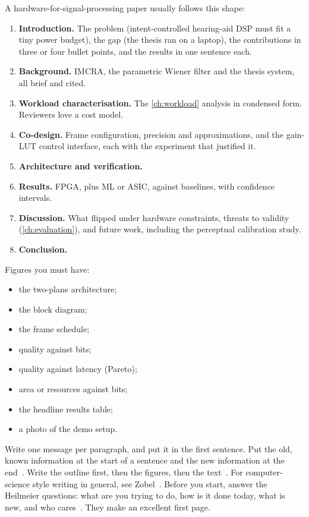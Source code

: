A hardware-for-signal-processing paper usually follows this shape:
\begin{enumerate}
  \item \textbf{Introduction.} The problem (intent-controlled hearing-aid DSP
        must fit a tiny power budget), the gap (the thesis ran on a laptop), the
        contributions in three or four bullet points, and the results in one
        sentence each.
  \item \textbf{Background.} IMCRA, the parametric Wiener filter and the thesis
        system, all brief and cited.
  \item \textbf{Workload characterisation.} The \cref{ch:workload} analysis in
        condensed form. Reviewers love a cost model.
  \item \textbf{Co-design.} Frame configuration, precision and approximations,
        and the gain-LUT control interface, each with the experiment that
        justified it.
  \item \textbf{Architecture and verification.}
  \item \textbf{Results.} FPGA, plus ML or ASIC, against baselines, with
        confidence intervals.
  \item \textbf{Discussion.} What flipped under hardware constraints, threats to
        validity (\cref{ch:evaluation}), and future work, including the
        perceptual calibration study.
  \item \textbf{Conclusion.}
\end{enumerate}

Figures you must have:
\begin{itemize}
  \item the two-plane architecture;
  \item the block diagram;
  \item the frame schedule;
  \item quality against bits;
  \item quality against latency (Pareto);
  \item area or resources against bits;
  \item the headline results table;
  \item a photo of the demo setup.
\end{itemize}

\begin{tipbox}
Write one message per paragraph, and put it in the first sentence. Put the old,
known information at the start of a sentence and the new information at the
end~\cite{ch12-13:gopen1990science}. Write the outline first, then the figures,
then the text~\cite{ch12-13:whitesides2004writing}. For computer-science style
writing in general, see Zobel~\cite{ch12-13:zobel2014writing}. Before you
start, answer the Heilmeier questions: what are you trying to do, how is it done
today, what is new, and who cares~\cite{ch12-13:heilmeier}. They make an
excellent first page.
\end{tipbox}

